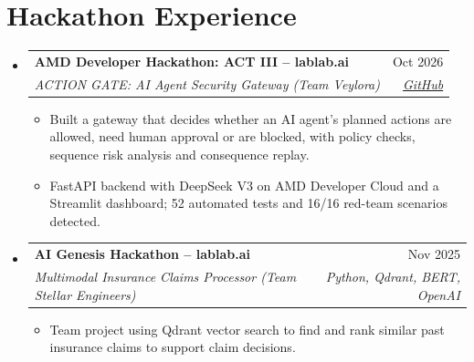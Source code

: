 \documentclass[a4paper,10pt]{article}
\makeatletter
\newcommand{\resumeItem}[1]{\item\small{#1 \vspace{-2pt}}}
\newcommand{\resumeSubheading}[4]{
  \vspace{-2pt}\item
    \begin{tabular*}{\textwidth}[t]{l@{\extracolsep{\fill}}r}
      \textbf{#1} & \small #2 \\
      \small\textit{#3} & \small\textit{#4} \\
    \end{tabular*}\vspace{-6pt}
}
\newcommand{\resumeSubHeadingListStart}{\begin{itemize}[leftmargin=0.0in, label={}]}
\newcommand{\resumeSubHeadingListEnd}{\end{itemize}}
\newcommand{\resumeItemListStart}{\begin{itemize}[leftmargin=0.18in, itemsep=0pt]}
\newcommand{\resumeItemListEnd}{\end{itemize}\vspace{-4pt}}
\makeatother
\begin{document}
\section{Hackathon Experience}
\resumeSubHeadingListStart
  \resumeSubheading
    {AMD Developer Hackathon: ACT III -- lablab.ai}{Oct 2026}
    {ACTION GATE: AI Agent Security Gateway (Team Veylora)}{\href{https://github.com/nimrafaryal/action-gate}{GitHub}}
    \resumeItemListStart
      \resumeItem{Built a gateway that decides whether an AI agent's planned actions are allowed, need human approval or are blocked, with policy checks, sequence risk analysis and consequence replay.}
      \resumeItem{FastAPI backend with DeepSeek V3 on AMD Developer Cloud and a Streamlit dashboard; 52 automated tests and 16/16 red-team scenarios detected.}
    \resumeItemListEnd
  \resumeSubheading
    {AI Genesis Hackathon -- lablab.ai}{Nov 2025}
    {Multimodal Insurance Claims Processor (Team Stellar Engineers)}{Python, Qdrant, BERT, OpenAI}
    \resumeItemListStart
      \resumeItem{Team project using Qdrant vector search to find and rank similar past insurance claims to support claim decisions.}
    \resumeItemListEnd
\resumeSubHeadingListEnd

\end{document}
